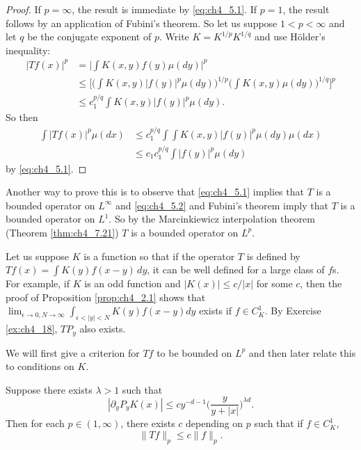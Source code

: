 \begin{proof}
If $p = \infty$, the result is immediate by \eqref{eq:ch4_5.1}. If $p = 1$, the result follows by an application of Fubini's theorem. So let us suppose $1 < p < \infty$ and let $q$ be the conjugate exponent of $p$. Write $K = K^{1/p}K^{1/q}$ and use H\"older's inequality:
\begin{align*}
    |Tf(x)|^p &= \Big|\int K(x,y)f(y)\mu(dy)\Big|^p \\
    &\leq \Big[\Big(\int K(x,y)|f(y)|^p\mu(dy)\Big)^{1/p}\Big(\int K(x,y)\mu(dy)\Big)^{1/q}\Big]^p \\
    &\leq c_1^{p/q} \int K(x,y)|f(y)|^p\mu(dy).
\end{align*}
So then
\begin{align*}
    \int |Tf(x)|^p\mu(dx) &\leq c_1^{p/q} \int \int K(x,y)|f(y)|^p\mu(dy)\mu(dx) \\
    &\leq c_1c_1^{p/q} \int |f(y)|^p\mu(dy)
\end{align*}
by \eqref{eq:ch4_5.1}.
\end{proof}

Another way to prove this is to observe that \eqref{eq:ch4_5.1} implies that $T$ is a bounded operator on $L^\infty$ and \eqref{eq:ch4_5.2} and Fubini's theorem imply that $T$ is a bounded operator on $L^1$. So by the Marcinkiewicz interpolation theorem (Theorem \ref{thm:ch4_7.21}) $T$ is a bounded operator on $L^p$.



Let us suppose $K$ is a function so that if the operator $T$ is defined by $Tf(x) = \int K(y)f(x-y)\,dy$, it can be well defined for a large class of $f$s. For example, if $K$ is an odd function and $|K(x)| \leq c/|x|$ for some $c$, then the proof of Proposition \ref{prop:ch4_2.1} shows that $\lim_{\epsilon\to 0,N\to\infty} \int_{\epsilon<|y|<N} K(y)f(x-y)dy$ exists if $f \in C_K^1$. By Exercise \ref{ex:ch4_18}, $TP_y$ also exists.

We will first give a criterion for $Tf$ to be bounded on $L^p$ and then later relate this to conditions on $K$.

\begin{theorem}\label{thm:ch4_5.2}
Suppose there exists $\lambda > 1$ such that
\begin{equation}\label{eq:ch4_5.3}
    |\partial_yP_yK(x)| \leq cy^{-d-1}\Big(\frac{y}{y+|x|}\Big)^{\lambda d}.
\end{equation}
Then for each $p \in (1,\infty)$, there exists $c$ depending on $p$ such that if $f \in C_K^1$,
\[
    \|Tf\|_p \leq c\|f\|_p.
\]
\end{theorem}

